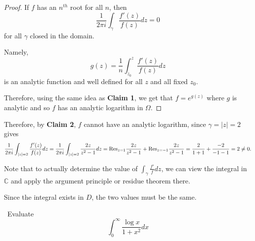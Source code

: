\documentclass[12pt]{Qual}
\begin{document}
\begin{solution}
\begin{claim}
\begin{proof}
\boxed{\impliedby} If $f$ has an $n^{th}$ root for all $n$, then $$\frac{1}{2\pi i}\int_\gamma\frac{f'(z)}{f(z)}dz=0$$ for all $\gamma$ closed in the domain.

Namely, $$g(z)=\frac{1}{n}\int_{z_0}^z\frac{f'(z)}{f(z)}dz$$ is an analytic function and well defined for all $z$ and all fixed $z_0$.

Therefore, using the same idea as \textbf{Claim 1}, we get that $f=e^{g(z)}$ where $g$ is analytic and so $f$ has an analytic logarithm in $\Omega.$
\end{proof}
\end{claim}

Therefore, by \textbf{Claim 2}, $f$ cannot have an analytic logarithm, since $\gamma=|z|=2$ gives $$\frac{1}{2\pi i}\int_{|z|=2}\frac{f'(z)}{f(z)}dz=\frac{1}{2\pi i}\int_{|z|=2}\frac{2z}{z^2-1}dz=\text{Res}_{z=1}\frac{2z}{z^2-1}+\text{Res}_{z=-1}\frac{2z}{z^2-1}=\frac{2}{1+1}+\frac{-2}{-1-1}=2\not=0.$$

\begin{framed}
Note that to actually determine the value of $\displaystyle \int_\gamma\frac{f'}{f}dz$, we can view the integral in $\mathbb{C}$ and apply the argument principle or residue theorem there.

Since the integral exists in $D$, the two values must be the same.
\end{framed}
\end{solution}
\newpage




\begin{problem} $\,$
Evaluate $$\int_0^\infty\frac{\log x}{1+x^2}dx$$
\end{problem}
\end{document}
